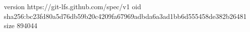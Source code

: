 version https://git-lfs.github.com/spec/v1
oid sha256:bc23fd80a5d76db59b20c4209fa67969adbda6a3ad1bb6d555458de382b26481
size 894044
